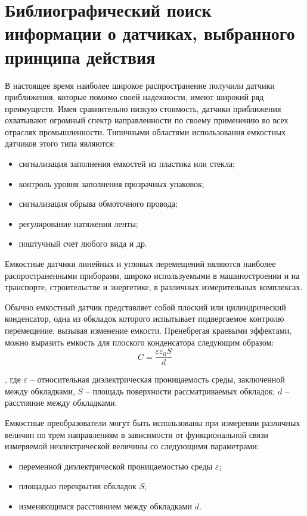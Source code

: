 
\section{Библиографический поиск информации о датчиках, выбранного принципа действия}
В настоящее время наиболее широкое распространение получили датчики приближения, которые помимо своей надежности, имеют широкий ряд преимуществ. Имея сравнительно низкую стоимость, датчики приближения охватывают огромный спектр направленности по своему применению во всех отраслях промышленности. Типичными областями использования емкостных датчиков этого типа являются:
\begin{itemize}
	\item сигнализация заполнения емкостей из пластика или стекла;
	\item контроль уровня заполнения прозрачных упаковок;
	\item сигнализация обрыва обмоточного провода;
	\item регулирование натяжения ленты;
	\item поштучный счет любого вида и др.
\end{itemize}

Емкостные датчики линейных и угловых перемещений являются наиболее распространенными приборами, широко используемыми в машиностроении и на транспорте, строительстве и энергетике, в различных измерительных комплексах.

Обычно емкостный датчик представляет собой плоский или цилиндрический конденсатор, одна из обкладок которого испытывает подвергаемое контролю перемещение, вызывая изменение емкости. Пренебрегая краевыми эффектами, можно выразить емкость для плоского конденсатора следующим образом:
\begin{equation}
	\label{eq:e1}
	C = \frac{\varepsilon \varepsilon_0 S}{d}
\end{equation}

, где \(\varepsilon\) -- относительная диэлектрическая проницаемость среды, заключенной между обкладками, \(S\) -- площадь поверхности рассматриваемых обкладок; \(d\) -- расстояние между обкладками.

Емкостные преобразователи могут быть использованы при измерении различных величин по трем направлениям в зависимости от функциональной связи измеряемой неэлектрической величины со следующими параметрами:
\begin{itemize}
	\item переменной диэлектрической проницаемостью среды \(\varepsilon\);
	\item площадью перекрытия обкладок \(S\);
	\item изменяющимся расстоянием между обкладками \(d\).
\end{itemize}

